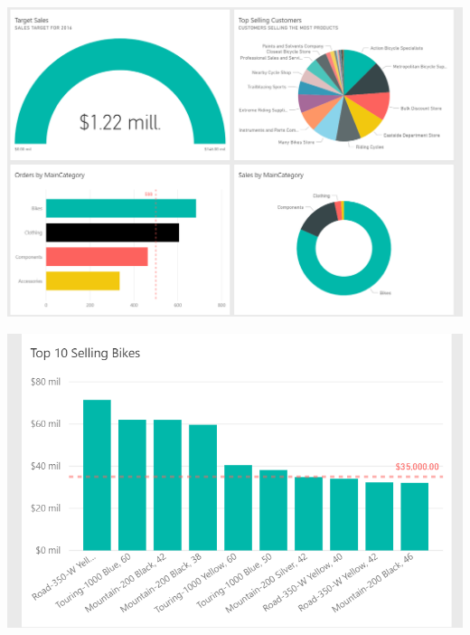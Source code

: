 \begin{itemize}
\begin{enumerate}
\begin{center}
\includegraphics[scale=0.60]{./Imagenes/ejer3_panel1.png}
\end{center}
\begin{center}
\includegraphics[scale=0.55]{./Imagenes/ejer3_panel2.png}
\end{center}

\end{enumerate}

\end{itemize}







